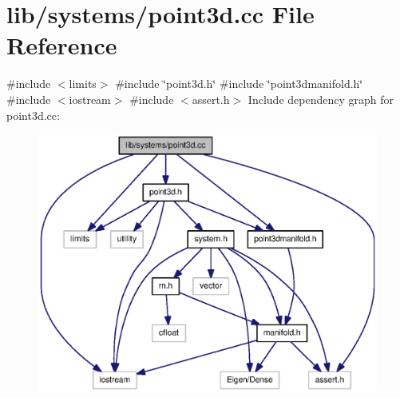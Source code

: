 \section{lib/systems/point3d.cc \-File \-Reference}
\label{point3d_8cc}
{\ttfamily \#include $<$limits$>$}\*
{\ttfamily \#include \char`\"{}point3d.\-h\char`\"{}}\*
{\ttfamily \#include \char`\"{}point3dmanifold.\-h\char`\"{}}\*
{\ttfamily \#include $<$iostream$>$}\*
{\ttfamily \#include $<$assert.\-h$>$}\*
\-Include dependency graph for point3d.\-cc\-:
\nopagebreak
\begin{figure}[H]
\begin{center}
\leavevmode
\includegraphics[width=350pt]{point3d_8cc__incl}
\end{center}
\end{figure}
